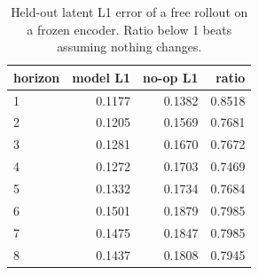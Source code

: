 \begin{table}[t]
\centering
\begin{tabular}{lrrr}
\toprule
horizon & model L1 & no-op L1 & ratio \\
\midrule
1 & 0.1177 & 0.1382 & 0.8518 \\
2 & 0.1205 & 0.1569 & 0.7681 \\
3 & 0.1281 & 0.1670 & 0.7672 \\
4 & 0.1272 & 0.1703 & 0.7469 \\
5 & 0.1332 & 0.1734 & 0.7684 \\
6 & 0.1501 & 0.1879 & 0.7985 \\
7 & 0.1475 & 0.1847 & 0.7985 \\
8 & 0.1437 & 0.1808 & 0.7945 \\
\bottomrule
\end{tabular}
\caption{Held-out latent L1 error of a free rollout on a frozen encoder. Ratio below 1 beats assuming nothing changes.}
\label{tab:horizon}
\end{table}
